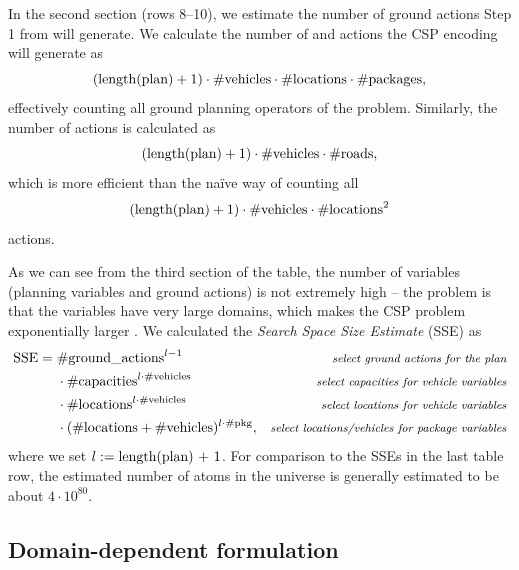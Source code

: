 In the second section (rows 8--10), we estimate the number of ground actions
Step 1 from \citet[Section~8.3.1]{Ghallab2004} will generate.
We calculate the number of \pickup{} and \drop{} actions the CSP encoding will generate
as $$(\textrm{length(plan)} + 1) \cdot \textrm{\#vehicles} \cdot \textrm{\#locations} \cdot \textrm{\#packages},$$
effectively counting all ground planning operators of the problem. Similarly,
the number of \drive{} actions is calculated as
$$(\textrm{length(plan)} + 1) \cdot \textrm{\#vehicles} \cdot \textrm{\#roads},$$
which is more efficient than the na{\"{i}}ve way of
counting all
$$(\textrm{length(plan)} + 1) \cdot \textrm{\#vehicles} \cdot \textrm{\#locations}^2$$
actions.

As we can see from the third section of the table, the number of variables
(planning variables and ground actions) is not extremely high --
the problem is that the variables have very large domains,
which makes the CSP problem exponentially larger \citep[Section~8.3.2]{Ghallab2004}.
We calculated the \textit{Search Space Size Estimate} (SSE) as
\begin{align*}
\textrm{SSE} =\; &\textrm{\#ground\_actions}^{l-1} & \textit{\footnotesize select ground actions for the plan}\\
&\cdot \textrm{\#capacities}^{l \cdot \textrm{\#vehicles}} & \textit{\footnotesize select capacities for vehicle variables}\\
&\cdot \textrm{\#locations}^{l \cdot \textrm{\#vehicles}} & \textit{\footnotesize select locations for vehicle variables}\\
&\cdot (\textrm{\#locations} + \textrm{\#vehicles})^{l \cdot \textrm{\#pkg}}, & \textit{\footnotesize select locations/vehicles for package variables}
\end{align*}
where we set $l := \textrm{length(plan) + 1}$.
For comparison to the SSEs in the last table row, 
the estimated number of atoms in the universe is generally estimated to be about $4 \cdot 10^{80}$.

\subsection{Domain-dependent formulation}\label{csp-custom-repr}



